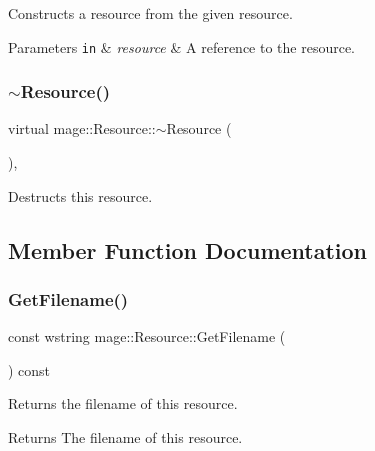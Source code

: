 Constructs a resource from the given resource.


\begin{DoxyParams}[1]{Parameters}
\mbox{\tt in}  & {\em resource} & A reference to the resource. \\
\hline
\end{DoxyParams}
\hypertarget{classmage_1_1_resource_a26cea6261aac321d95ac745703f1a3e8}{}\label{classmage_1_1_resource_a26cea6261aac321d95ac745703f1a3e8} 
\subsubsection{\texorpdfstring{$\sim$\+Resource()}{~Resource()}}
{\footnotesize\ttfamily virtual mage\+::\+Resource\+::$\sim$\+Resource (\begin{DoxyParamCaption}{ }\end{DoxyParamCaption})\hspace{0.3cm}{\ttfamily [virtual]}, {\ttfamily [default]}}

Destructs this resource. 

\subsection{Member Function Documentation}
\hypertarget{classmage_1_1_resource_a1f05385b8c05646989689fc04847a816}{}\label{classmage_1_1_resource_a1f05385b8c05646989689fc04847a816} 
\subsubsection{\texorpdfstring{Get\+Filename()}{GetFilename()}}
{\footnotesize\ttfamily const wstring mage\+::\+Resource\+::\+Get\+Filename (\begin{DoxyParamCaption}{ }\end{DoxyParamCaption}) const}

Returns the filename of this resource.

\begin{DoxyReturn}{Returns}
The filename of this resource. 
\end{DoxyReturn}
\hypertarget{classmage_1_1_resource_a6c253886da9b0c3a52ca7a38ba448d74}{}\label{classmage_1_1_resource_a6c253886da9b0c3a52ca7a38ba448d74} 
